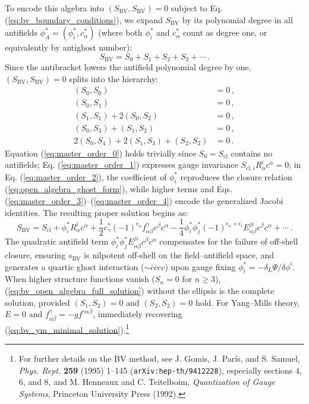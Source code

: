 To encode this algebra into \((S_{\text{BV}}, S_{\text{BV}}) = 0\) subject to Eq. (\ref{eq:bv_boundary_conditions}), we expand \(S_{\text{BV}}\) by its polynomial degree in all antifields \(\phi_A^* = (\phi_i^*, c_\alpha^*)\) (where both \(\phi_i^*\) and \(c_\alpha^*\) count as degree one, or equivalently by antighost number):
\begin{equation} \label{eq:action_antifield_expansion}
    S_{\text{BV}} = S_0 + S_1 + S_2 + S_3 + \cdots \, .
\end{equation}
Since the antibracket lowers the antifield polynomial degree by one, \((S_{\text{BV}}, S_{\text{BV}}) = 0\) splits into the hierarchy:
\begin{align}
    (S_0, S_0)                             & = 0 \, , \label{eq:master_order_0} \\
    (S_0, S_1)                             & = 0 \, , \label{eq:master_order_1} \\
    (S_1, S_1) + 2(S_0, S_2)               & = 0 \, , \label{eq:master_order_2} \\
    (S_0, S_3) + (S_1, S_2)                & = 0 \, , \label{eq:master_order_3} \\
    2(S_0, S_4) + 2(S_1, S_3) + (S_2, S_2) & = 0 \, . \label{eq:master_order_4}
\end{align}
Equation (\ref{eq:master_order_0}) holds trivially since \(S_0 = S_{\text{cl}}\) contains no antifields; Eq. (\ref{eq:master_order_1}) expresses gauge invariance \(S_{\text{cl}, i} R^i_\alpha c^\alpha = 0\); in Eq. (\ref{eq:master_order_2}), the coefficient of \(\phi_i^*\) reproduces the closure relation (\ref{eq:open_algebra_ghost_form}), while higher terms and Eqs. (\ref{eq:master_order_3})--(\ref{eq:master_order_4}) encode the generalized Jacobi identities. The resulting proper solution begins as:
\begin{equation} \label{eq:bv_open_algebra_full_solution}
    \boxed{S_{\text{BV}} = S_{\text{cl}} + \phi_i^* R^i_\alpha c^\alpha + \frac{1}{2} c_\gamma^* (-1)^{\epsilon_\alpha} f^\gamma_{\alpha\beta} c^\beta c^\alpha - \frac{1}{4} \phi_i^* \phi_j^* (-1)^{\epsilon_\alpha + \epsilon_i} E^{ji}_{\alpha\beta} c^\beta c^\alpha + \cdots} \, .
\end{equation}
The quadratic antifield term \(\phi_i^* \phi_j^* E^{ji}_{\alpha\beta} c^\beta c^\alpha\) compensates for the failure of off-shell closure, ensuring \(s_{\text{BV}}\) is nilpotent off-shell on the field--antifield space, and generates a quartic ghost interaction (\(\sim \bar{c}\bar{c}cc\)) upon gauge fixing \(\phi_i^* = -\delta_L\Psi / \delta\phi^i\). When higher structure functions vanish (\(S_n = 0\) for \(n \ge 3\)), (\ref{eq:bv_open_algebra_full_solution}) without the ellipsis is the complete solution, provided \((S_1, S_2) = 0\) and \((S_2, S_2) = 0\) hold. For Yang--Mills theory, \(E = 0\) and \(f^\gamma_{\alpha\beta} = -g f^{\gamma\alpha\beta}\), immediately recovering (\ref{eq:bv_ym_minimal_solution}).\footnote{For further details on the BV method, see J. Gomis, J. París, and S. Samuel, \textit{Phys. Rept.} \textbf{259} (1995) 1--145 (\texttt{arXiv:hep-th/9412228}), especially sections 4, 6, and 8, and M. Henneaux and C. Teitelboim, \textit{Quantization of Gauge Systems}, Princeton University Press (1992).}